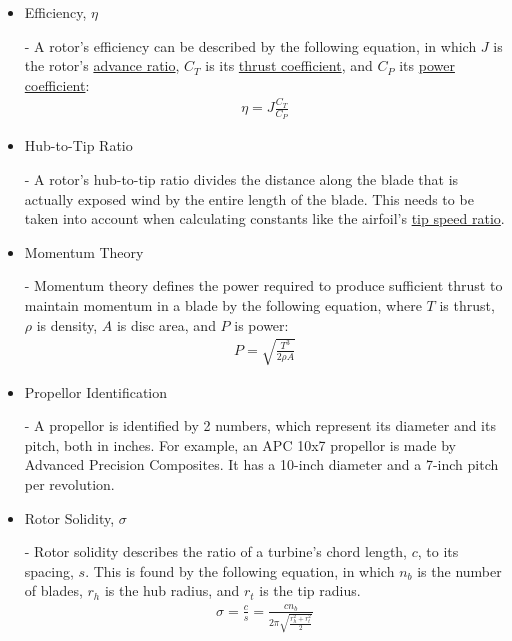 \documentclass{article}
\begin{document}
\begin{itemize}
	\item \hypertarget{eta}{Efficiency, $\eta$} - A rotor's efficiency can be described by the following equation, in which $J$ is the rotor's \hyperlink{J}{advance ratio}, $C_{T}$ is its \hyperlink{CT}{thrust coefficient}, and $C_{P}$ its \hyperlink{CP}{power coefficient}:
	\begin{equation}
	\begin{aligned}
		\eta = J \frac{C_{T}}{C_{P}}
	\end{aligned}
	\end{equation}
	
	\item \hypertarget{D/D}{Hub-to-Tip Ratio} - A rotor's hub-to-tip ratio divides the distance along the blade that is actually exposed wind by the entire length of the blade. This needs to be taken into account when calculating constants like the airfoil's \hyperlink{lambda}{tip speed ratio}.
	
	\item \hypertarget{MT}{Momentum Theory} - Momentum theory defines the power required to produce sufficient thrust to maintain momentum in a blade by the following equation, where $T$ is thrust, $\rho$ is density, $A$ is disc area, and $P$ is power:
	\begin{equation}
	\begin{aligned}
        		P = \sqrt{\frac{T^{3}}{2 \rho A}}
	\end{aligned}
	\end{equation}
	
	\item \hypertarget{APC}{Propellor Identification} - A propellor is identified by 2 numbers, which represent its diameter and its pitch, both in inches. For example, an APC 10x7 propellor is made by Advanced Precision Composites. It has a 10-inch diameter and a 7-inch pitch per revolution.
	
	\item \hypertarget{sigma}{Rotor Solidity, $\sigma$} - Rotor solidity describes the ratio of a turbine's chord length, $c$, to its spacing, $s$. This is found by the following equation, in which $n_{b}$ is the number of blades, $r_{h}$ is the hub radius, and $r_{t}$ is the tip radius.
	\begin{equation}
	\begin{aligned}
		\sigma = \frac{c}{s} = \frac{c n_{b}}{2 \pi \sqrt{\frac{r^{2}_{h} + r^{2}_{t}}{2}}}
	\end{aligned}
	\end{equation}
	

\end{itemize}
\end{document}
